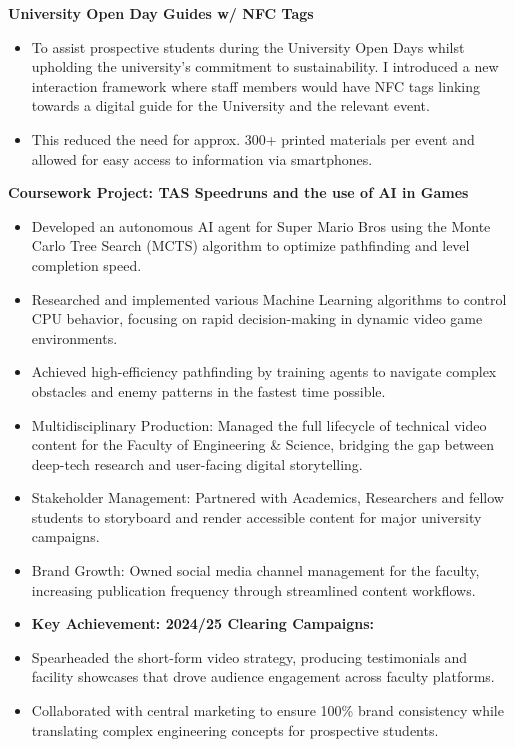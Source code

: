 \documentclass[10pt,a4paper,ragged2e]{altacv}
\begin{document}
\smallskip
\textbf{University Open Day Guides w/ NFC Tags} \\
\begin{itemize}
  \item To assist prospective students during the University Open Days whilst upholding the university's
   commitment to sustainability. I introduced a new interaction framework where staff members would 
   have NFC tags linking towards a digital guide for the University and the relevant event. 
  \item This reduced the need for approx. 300+ printed materials per event and allowed for easy access to information via 
   smartphones.
\end{itemize}
\textbf{Coursework Project: TAS Speedruns and the use of AI in Games} \\
\begin{itemize}
  \item Developed an autonomous AI agent for Super Mario Bros using the Monte Carlo Tree Search (MCTS) algorithm to optimize pathfinding and level completion speed.
  \item Researched and implemented various Machine Learning algorithms to control CPU behavior, focusing on rapid decision-making in dynamic video game environments.
  \item Achieved high-efficiency pathfinding by training agents to navigate complex obstacles and enemy patterns in the fastest time possible.
\end{itemize}




\newpage
{}

\begin{itemize}
\item Multidisciplinary Production: Managed the full lifecycle of technical video content for the Faculty of Engineering \& Science, bridging the gap between deep-tech research and user-facing digital storytelling.
\item Stakeholder Management: Partnered with Academics, Researchers and fellow students to storyboard and render accessible content for major university campaigns.
\item Brand Growth: Owned social media channel management for the faculty, increasing publication frequency through streamlined content workflows.
\item \textbf{Key Achievement: 2024/25 Clearing Campaigns:}
\item Spearheaded the short-form video strategy, producing testimonials and facility showcases that drove audience engagement across faculty platforms.
\item Collaborated with central marketing to ensure 100\% brand consistency while translating complex engineering concepts for prospective students.
\end{itemize}
\end{document}
